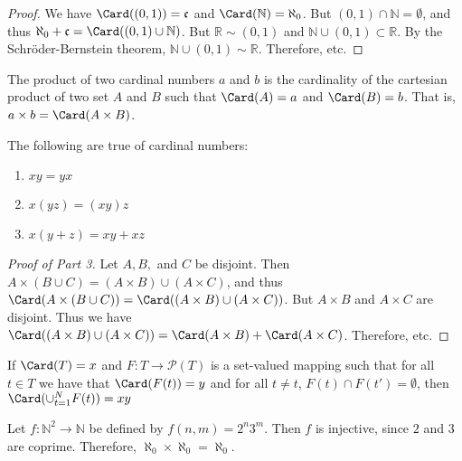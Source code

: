     \begin{proof}
        We have $\Card((0,1))=\mathfrak{c}$ and
        $\Card(\mathbb{N})=\aleph_{0}$. But
        $(0,1)\cap\mathbb{N}=\emptyset$, and thus
        $\aleph_{0}+\mathfrak{c}%
         =\Card((0,1)\cup\mathbb{N})$.
        But $\mathbb{R}\sim(0,1)$ and
        $\mathbb{N}\cup(0,1)\subset\mathbb{R}$.
        By the Schr\"{o}der-Bernstein theorem,
        $\mathbb{N}\cup(0,1)\sim\mathbb{R}$.
        Therefore, etc.
    \end{proof}
    \begin{definition}
        The product of two cardinal numbers $a$ and $b$
        is the cardinality of the cartesian product
        of two set $A$ and $B$ such that
        $\Card(A)=a$ and $\Card(B)=b$. That is,
        ${a}\times{b}=\Card({A}\times{B})$.
    \end{definition}
    \begin{theorem}
        The following are true of cardinal numbers:
        \begin{enumerate}
            \item $xy=yx$
            \item $x(yz)=(xy)z$
            \item $x(y+z)=xy+xz$
        \end{enumerate}
    \end{theorem}
    \begin{proof}[Proof of Part 3]
        Let $A,B,$ and $C$ be disjoint.
        Then
        ${A}\times{({B}\cup{C})}%
         =({A}\times{B})\cup({A}\times{C})$, and thus
        $\Card({A}\times{({B}\cup{C})})%
         =\Card(({A}\times{B})\cup({A}\times{C}))$.
        But ${A}\times{B}$ and ${A}\times{C}$ are disjoint.
        Thus we have
        $\Card(({A}\times{B})\cup({A}\times{C}))%
         =\Card({A}\times{B})+\Card({A}\times{C})$.
        Therefore, etc.
    \end{proof}
    \begin{theorem}
        If $\Card(T)=x$ and $F:{T}\rightarrow{\mathcal{P}(T)}$ is a
        set-valued mapping such that for all ${t}\in{T}$ we have that
        $\Card(F(t))=y$ and for all ${t}\ne{t}$,
        ${F(t)}\cap{F(t')}=\emptyset$, then $\Card(\cup_{t=1}^{N}F(t))=xy$
    \end{theorem}
    \begin{example}
        Let $f:{\mathbb{N}^{2}}\rightarrow{\mathbb{N}}$
        be defined by $f(n,m)=2^{n}3^{m}$.
        Then $f$ is injective, since $2$ and $3$
        are coprime. Therefore,
        $\aleph_{0}\times\aleph_{0}=\aleph_{0}$.
    \end{example}

